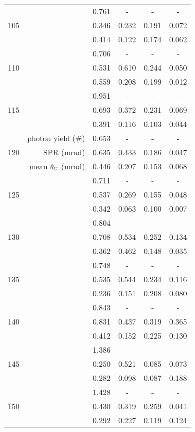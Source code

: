\begin{longtable}{|crcccc|}
\multirow{3}{*}{105} &  & 0.761 & - & - & - \\* 
	 &  & 0.346 & 0.232 & 0.191 & 0.072 \\* 
	 &  & 0.414 & 0.122 & 0.174 & 0.062 \\ \hline 
\multirow{3}{*}{110} &  & 0.706 & - & - & - \\* 
	 &  & 0.531 & 0.610 & 0.244 & 0.050 \\* 
	 &  & 0.559 & 0.208 & 0.199 & 0.012 \\ \hline 
\multirow{3}{*}{115} &  & 0.951 & - & - & - \\* 
	 &  & 0.693 & 0.372 & 0.231 & 0.069 \\* 
	 &  & 0.391 & 0.116 & 0.103 & 0.044 \\ \hline 
\multirow{3}{*}{120} & photon yield (\#) & 0.653 & - & - & - \\* 
	 & SPR (mrad) & 0.635 & 0.433 & 0.186 & 0.047 \\* 
	 & mean $\theta_{C}$ (mrad) & 0.446 & 0.207 & 0.153 & 0.068 \\ \hline 
\multirow{3}{*}{125} &  & 0.711 & - & - & - \\* 
	 &  & 0.537 & 0.269 & 0.155 & 0.048 \\* 
	 &  & 0.342 & 0.063 & 0.100 & 0.007 \\ \hline 
\multirow{3}{*}{130} &  & 0.804 & - & - & - \\* 
	 &  & 0.708 & 0.534 & 0.252 & 0.134 \\* 
	 &  & 0.362 & 0.462 & 0.148 & 0.035 \\ \hline 
\multirow{3}{*}{135} &  & 0.748 & - & - & - \\* 
	 &  & 0.535 & 0.544 & 0.234 & 0.116 \\* 
	 &  & 0.236 & 0.151 & 0.208 & 0.080 \\ \hline 
\multirow{3}{*}{140} &  & 0.843 & - & - & - \\* 
	 &  & 0.831 & 0.437 & 0.319 & 0.365 \\* 
	 &  & 0.412 & 0.152 & 0.225 & 0.130 \\ \hline 
\multirow{3}{*}{145} &  & 1.386 & - & - & - \\* 
	 &  & 0.250 & 0.521 & 0.085 & 0.073 \\* 
	 &  & 0.282 & 0.098 & 0.087 & 0.188 \\ \hline 
\multirow{3}{*}{150} &  & 1.428 & - & - & - \\* 
	 &  & 0.430 & 0.319 & 0.259 & 0.041 \\* 
	 &  & 0.292 & 0.227 & 0.119 & 0.124 \\ \hline 

\end{longtable}
